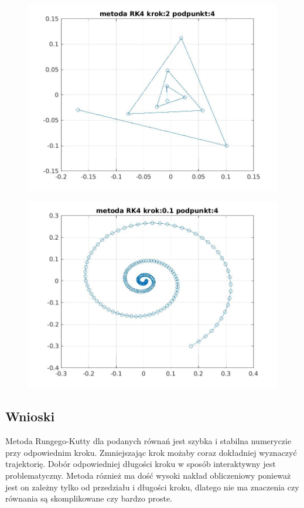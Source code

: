 \documentclass[a4paper, 11pt]{article}
\begin{document}
\begin{figure}[htp]
\centering
\includegraphics[width = 15cm]{2d/metoda RK4 krok:2 podpunkt:4.jpg}
\end{figure}

\begin{figure}[htp]
\centering
\includegraphics[width = 15cm]{2d/metoda RK4 krok:0,1 podpunkt:4.jpg}
\end{figure}

\subsection{Wnioski}
Metoda Rungego-Kutty dla podanych równań jest szybka i stabilna numeryczie przy odpowiednim kroku. Zmniejszając krok możaby coraz dokładniej wyznaczyć trajektorię. Dobór odpowiedniej długości kroku w sposób interaktywny jest problematyczny. Metoda róznież ma dość wysoki nakład obliczeniowy ponieważ jest on zależny tylko od przedziału i długości kroku, dlatego nie ma znaczenia czy równania są skomplikowane czy bardzo proste. 
\end{document}
